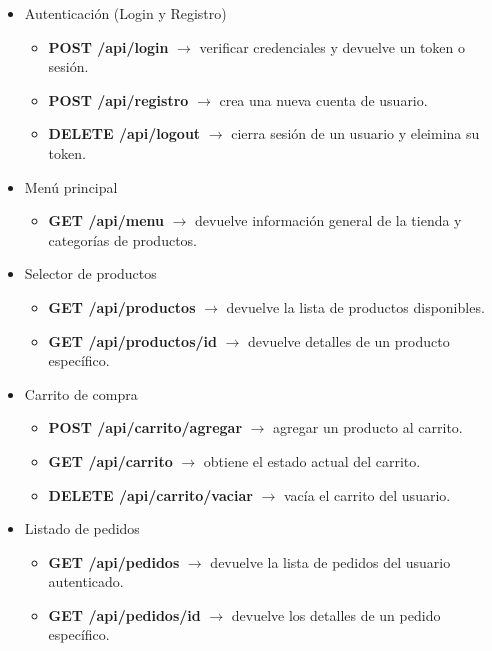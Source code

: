 \documentclass[10pt]{book}
\begin{document}
        \begin{itemize}
            \item Autenticación (Login y Registro)
            \begin{itemize}
                \item \textbf{POST /api/login} $\rightarrow$ verificar credenciales y devuelve un token o sesión.
                \item \textbf{POST /api/registro} $\rightarrow$ crea una nueva cuenta de usuario.
                \item \textbf{DELETE /api/logout} $\rightarrow$ cierra sesión de un usuario y eleimina su token.
            \end{itemize}
            \item Menú principal
            \begin{itemize}
                \item \textbf{GET /api/menu} $\rightarrow$ devuelve información general de la tienda y categorías de productos.
            \end{itemize}
            \item Selector de productos
            \begin{itemize}
                \item \textbf{GET /api/productos} $\rightarrow$ devuelve la lista de productos disponibles.
                \item \textbf{GET /api/productos/{id}} $\rightarrow$ devuelve detalles de un producto específico.
            \end{itemize}
            \item Carrito de compra
            \begin{itemize}
                \item \textbf{POST /api/carrito/agregar} $\rightarrow$ agregar un producto al carrito.
                \item \textbf{GET /api/carrito} $\rightarrow$ obtiene el estado actual del carrito.
                \item \textbf{DELETE /api/carrito/vaciar} $\rightarrow$ vacía el carrito del usuario.
            \end{itemize}
            \item Listado de pedidos
            \begin{itemize}
                \item \textbf{GET /api/pedidos} $\rightarrow$ devuelve la lista de pedidos del usuario autenticado.
                \item \textbf{GET /api/pedidos/{id}} $\rightarrow$ devuelve los detalles de un pedido específico.

\end{itemize}
\end{itemize}
\end{document}
